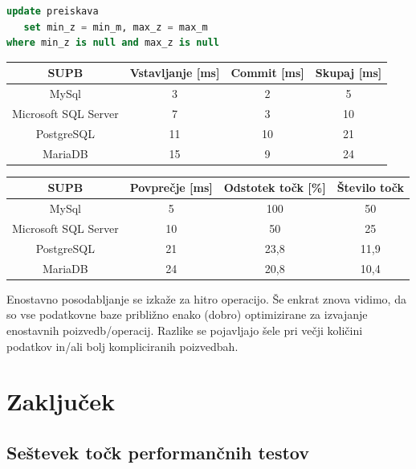 \documentclass[a4paper,11pt]{report}
\begin{document}
\begin{lstlisting}[language = SQL]
update preiskava
   set min_z = min_m, max_z = max_m
where min_z is null and max_z is null
\end{lstlisting}

\begin{center}
   \begin{tabular}{||c|c|c|c||}
      \hline
      \textbf{SUPB} & \textbf{Vstavljanje [ms]} & \textbf{Commit [ms]} & \textbf{Skupaj [ms]}\\
      \hline
      \hline
      MySql & 3 & 2 & 5\\
      Microsoft SQL Server & 7 & 3 & 10 \\
      PostgreSQL & 11 & 10 & 21 \\
      MariaDB & 15 & 9 & 24 \\
      \hline
   \end{tabular}
\end{center}

\begin{center}
   \begin{tabular}{||c|c|c|c||}
      \hline
      \textbf{SUPB} & \textbf{Povprečje [ms]} & \textbf{Odstotek točk [\%]} & \textbf{Število točk}\\
      \hline
      \hline
      MySql & 5 & 100 & 50 \\
      Microsoft SQL Server & 10 & 50 & 25 \\
      PostgreSQL & 21 & 23,8 & 11,9\\
      MariaDB & 24 & 20,8 & 10,4 \\
      \hline
   \end{tabular}
\end{center}

Enostavno posodabljanje se izkaže za hitro operacijo. Še enkrat znova vidimo, da so vse podatkovne baze približno enako (dobro) optimizirane za izvajanje enostavnih poizvedb/operacij. Razlike se pojavljajo šele pri večji količini podatkov in/ali bolj kompliciranih poizvedbah.


\chapter{Zaključek}

\section{Seštevek točk performančnih testov}
\end{document}

